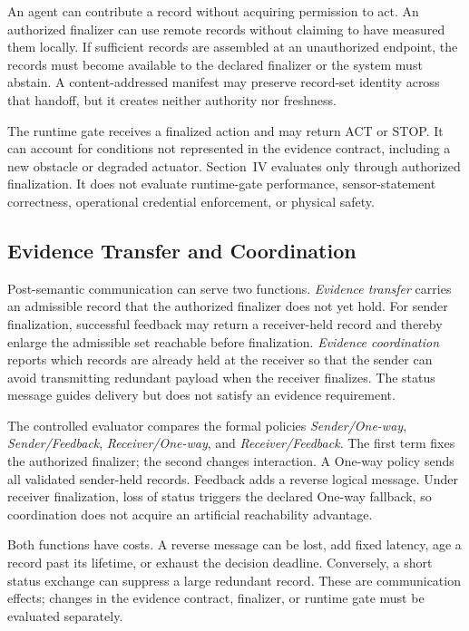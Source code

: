 An agent can contribute a record without acquiring permission to act. An
authorized finalizer can use remote records without claiming to have measured
them locally. If sufficient records are assembled at an unauthorized endpoint,
the records must become available to the declared finalizer or the system must
abstain. A content-addressed manifest may preserve record-set identity across
that handoff, but it creates neither authority nor freshness.

The runtime gate receives a finalized action and may return ACT or STOP. It can
account for conditions not represented in the evidence contract, including a
new obstacle or degraded actuator. Section~IV evaluates only through authorized
finalization. It does not evaluate runtime-gate performance, sensor-statement
correctness, operational credential enforcement, or physical safety.

\subsection{Evidence Transfer and Coordination}

Post-semantic communication can serve two functions. \emph{Evidence transfer}
carries an admissible record that the authorized finalizer does not yet hold.
For sender finalization, successful feedback may return a receiver-held record
and thereby enlarge the admissible set reachable before finalization.
\emph{Evidence coordination} reports which records are already held at the
receiver so that the sender can avoid transmitting redundant payload when the
receiver finalizes. The status message guides delivery but does not satisfy an
evidence requirement.

The controlled evaluator compares the formal policies \emph{Sender/One-way},
\emph{Sender/Feedback}, \emph{Receiver/One-way}, and
\emph{Receiver/Feedback}. The first term fixes the authorized finalizer; the
second changes interaction. A One-way policy sends all validated sender-held
records. Feedback adds a reverse logical message. Under receiver finalization,
loss of status triggers the declared One-way fallback, so coordination does
not acquire an artificial reachability advantage.

Both functions have costs. A reverse message can be lost, add fixed latency,
age a record past its lifetime, or exhaust the decision deadline. Conversely,
a short status exchange can suppress a large redundant record. These are
communication effects; changes in the evidence contract, finalizer, or runtime
gate must be evaluated separately.

